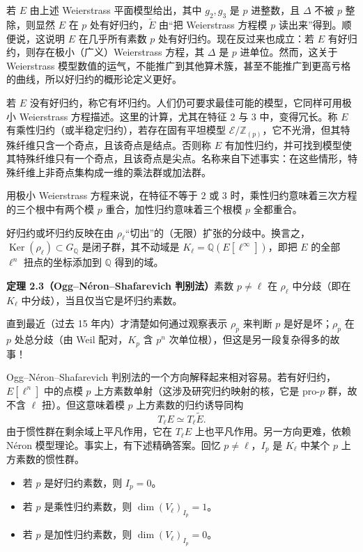 若 $E$ 由上述 Weierstrass 平面模型给出，其中 $g_2,g_3$ 是 $p$ 进整数，且 $\Delta$ 不被 $p$ 整除，则显然 $E$ 在 $p$ 处有好归约，$\tilde{E}$ 由“把 Weierstrass 方程模 $p$ 读出来”得到。顺便说，这说明 $E$ 在几乎所有素数 $p$ 处有好归约。现在反过来也成立：若 $E$ 有好归约，则存在极小（广义）Weierstrass 方程，其 $\Delta$ 是 $p$ 进单位。然而，这关于 Weierstrass 模型数值的运气，不能推广到其他算术簇，甚至不能推广到更高亏格的曲线，所以好归约的概形论定义更好。

若 $E$ 没有好归约，称它有坏归约。人们仍可要求最佳可能的模型，它同样可用极小 Weierstrass 方程描述。这里的计算，尤其在特征 $2$ 与 $3$ 中，变得冗长。称 $E$ 有乘性归约（或半稳定归约），若存在固有平坦模型 $\mathcal{E}/\mathbb{Z}_{(p)}$，它不光滑，但其特殊纤维只含一个奇点，且该奇点是结点。否则称 $E$ 有加性归约，并可找到模型使其特殊纤维只有一个奇点，且该奇点是尖点。名称来自下述事实：在这些情形，特殊纤维上非奇点集构成一维的乘法群或加法群。

用极小 Weierstrass 方程来说，在特征不等于 $2$ 或 $3$ 时，乘性归约意味着三次方程的三个根中有两个模 $p$ 重合，加性归约意味着三个根模 $p$ 全都重合。

好归约或坏归约反映在由 $\rho_\ell$“切出”的（无限）扩张的分歧中。换言之，$\operatorname{Ker}(\rho_\ell)\subset G_{\mathbb{Q}}$ 是闭子群，其不动域是 $K_\ell=\mathbb{Q}(E[\ell^\infty])$，即把 $E$ 的全部 $\ell^n$ 扭点的坐标添加到 $\mathbb{Q}$ 得到的域。

\par\medskip\noindent\textbf{定理 2.3（Ogg--Néron--Shafarevich 判别法）}\quad 素数 $p\neq\ell$ 在 $\rho_\ell$ 中分歧（即在 $K_\ell$ 中分歧），当且仅当它是坏归约素数。

直到最近（过去 15 年内）才清楚如何通过观察表示 $\rho_p$ 来判断 $p$ 是好是坏；$\rho_p$ 在 $p$ 处总分歧（由 Weil 配对，$K_p$ 含 $p^n$ 次单位根），但这是另一段复杂得多的故事！

Ogg--Néron--Shafarevich 判别法的一个方向解释起来相对容易。若有好归约，$E[\ell^n]$ 中的点模 $p$ 上方素数单射（这涉及研究归约映射的核，它是 pro-$p$ 群，故不含 $\ell$ 扭）。但这意味着模 $p$ 上方素数的归约诱导同构
\begin{equation}\tag{2.11}\label{c5:eq:2.11}
T_\ell E\simeq T_\ell\tilde{E}.
\end{equation}
由于惯性群在剩余域上平凡作用，它在 $T_\ell E$ 上也平凡作用。另一方向更难，依赖 Néron 模型理论。事实上，有下述精确答案。回忆 $p\neq\ell$，$I_p$ 是 $K_\ell$ 中某个 $p$ 上方素数的惯性群。

\begin{itemize}
\item 若 $p$ 是好归约素数，则 $I_p=0$。
\item 若 $p$ 是乘性归约素数，则 $\dim(V_\ell)_{I_p}=1$。
\item 若 $p$ 是加性归约素数，则 $\dim(V_\ell)_{I_p}=0$。
\end{itemize}

